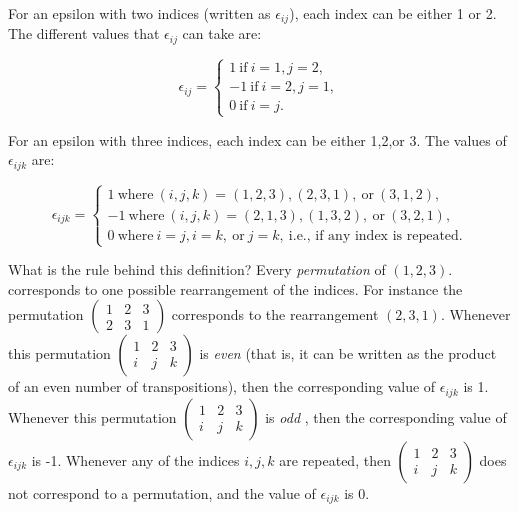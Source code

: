 For an epsilon with two indices (written as $\epsilon_{ij}$), each index can be either 1 or 2. The different values that $\epsilon_{ij}$ can take are:

\[ \epsilon_{ij}=
\begin{cases}
1 ~ \text{if} ~ i=1, j=2,  \\
-1 ~ \text{if} ~ i=2, j=1,  \\
0 ~ \text{if} ~ i=j.
\end{cases} \]

For an epsilon with three indices, each index can be either 1,2,or 3. The values of $\epsilon_{ijk}$ are:

\[ \epsilon_{ijk}=
\begin{cases}
1 ~ \text{where} ~ (i,j,k)= (1,2,3),  (2,3,1),  \mathrm{~or~}(3,1,2), \\
-1 ~ \text{where} ~ (i,j,k) = (2,1,3), (1,3,2),  \mathrm{~or~}(3,2,1),  \\
0 ~ \text{where} ~  i=j, i=k, ~ \text{or} ~ j=k, ~ \text{i.e., if any index is repeated.}
\end{cases} \]

What is the rule behind this definition?  Every \emph{permutation} of $(1,2,3)$.  corresponds to one possible rearrangement of the indices. For instance the permutation 
$ \left( \begin{smallmatrix}  1 & 2 & 3  \\ 2 & 3 & 1  \end{smallmatrix} \right)$ corresponds to the rearrangement $(2,3,1)$.  Whenever this permutation $\left( \begin{smallmatrix} 1 & 2 & 3  \\ i & j & k  \end{smallmatrix} \right) $ is \emph{even} (that is, it can be written as the product of an even number of transpositions), then the corresponding value of $\epsilon_{ijk}$ is 1. Whenever this permutation $\left( \begin{smallmatrix} 1 & 2 & 3  \\ i & j & k  \end{smallmatrix} \right)$ is \emph{odd} , then the corresponding value of $\epsilon_{ijk}$ is -1. Whenever any of the indices $i,j,k$  are repeated, then  $\left( \begin{smallmatrix} 1 & 2 & 3  \\ i & j & k  \end{smallmatrix} \right) $ does not correspond to a permutation, and the value of $\epsilon_{ijk}$ is 0.

